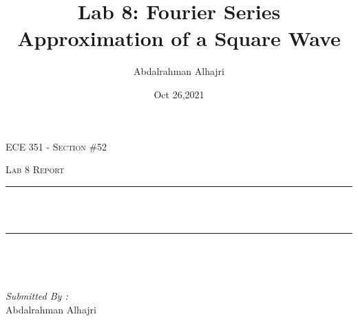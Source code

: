\documentclass[12pt]{report}
\title{Lab 8: Fourier Series Approximation of a Square Wave}
\author{Abdalrahman Alhajri}
\date{Oct 26,2021}
\makeatletter
\let\thetitle\@title
\makeatother
\begin{document}

\begin{titlepage}
	\centering
    \vspace*{0.5 cm}
\begin{center}    \textsc{\Large   ECE 351 - Section \#52 }\\[2.0 cm]	\end{center}%
	\textsc{\Large Lab 8 Report }\\[0.5 cm]				%
	\rule{\linewidth}{0.2 mm} \\[0.4 cm]
	{ \huge \bfseries \thetitle}\\
	\rule{\linewidth}{0.2 mm} \\[1.5 cm]
	
	\begin{minipage}{0.4\textwidth}
		\begin{flushleft} \large
			\end{flushleft}
			\end{minipage}~
			\begin{minipage}{0.4\textwidth}
            
			\begin{flushright} \large
			\emph{Submitted By :} \\
			Abdalrahman Alhajri 
		\end{flushright}
           
	\end{minipage}\\[2 cm]
	
    
    
    
    
	
\end{titlepage}


\tableofcontents
\pagebreak

\renewcommand{\thesection}{\arabic{section}}
\end{document}

